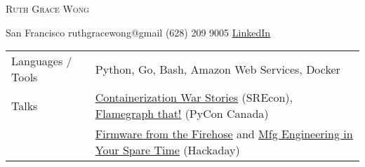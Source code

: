 \documentclass[letterpaper, oneside, final]{scrartcl} %
\begin{document}
\setlength{\pdfpagewidth}{8.5in}
\setlength{\pdfpageheight}{11in}

\begin{center} %


{\fontsize{36}{36}\spaceskip=12pt\selectfont\scshape Ruth Grace Wong} %

\vspace{1cm} %

{\renewcommand{\headfont}{\normalfont\rmfamily\scshape} %
\fontsize{12.5}{17}\selectfont\scshape %

San Francisco  {\large\textperiodcentered} ruthgracewong@gmail {\large\textperiodcentered} (628) 209 9005 {\large\textperiodcentered} \underline{\href{https://www.linkedin.com/in/ruthgracewong/}{LinkedIn}}
}

\vspace{0.2cm}

\begin{flushleft}
\begin{tabular}{ll}
     Languages / Tools & Python, Go, Bash, Amazon Web Services, Docker\\
     Talks & \underline{\href{https://www.usenix.org/conference/srecon18americas/presentation/wong}{Containerization War Stories}} (SREcon), \underline{\href{https://2017.pycon.ca/en/schedule/60/}{Flamegraph that!}} (PyCon Canada)\\
    & \underline{\href{https://hackaday.com/2019/02/22/supercon-ruth-grace-wong-and-firmware-from-the-firehose/}{Firmware from the Firehose}} and \underline{\href{https://hackaday.com/2020/01/03/you-could-be-a-manufacturing-engineer-if-you-could-only-find-the-time/}{Mfg Engineering in Your Spare Time}} (Hackaday) \\
\end{tabular}
\end{flushleft}



\end{center}
\end{document}
